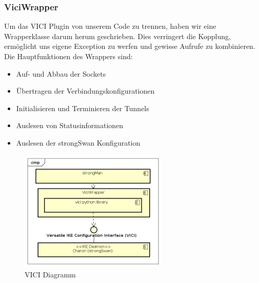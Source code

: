 \subsubsection{ViciWrapper}
\noindent
\begin{minipage}[t]{0.5\textwidth}
    \vspace{0pt}
Um das VICI Plugin von unserem Code zu trennen, haben wir eine Wrapperklasse darum herum geschrieben. Dies verringert die Kopplung, ermöglicht uns eigene Exception zu werfen und gewisse Aufrufe zu kombinieren. \\
Die Hauptfunktionen des Wrappers sind:
\begin{itemize}
    \item Auf- und Abbau der Sockets
    \item Übertragen der Verbindungskonfigurationen
    \item Initialisieren und Terminieren der Tunnels
    \item Auslesen von Statusinformationen
    \item Auslesen der strongSwan Konfiguration
\end{itemize}
    \hfill
\end{minipage}   
\noindent\begin{minipage}[t]{0.5\textwidth}
\vspace{0pt}
        \begin{figure}[H]
        \centering
        \includegraphics[width=200pt]{images/vici_wrapper.png}
        \caption[VICI Diagramm]{VICI Diagramm}
        \end{figure}
        \medskip
\end{minipage}
\hfill















